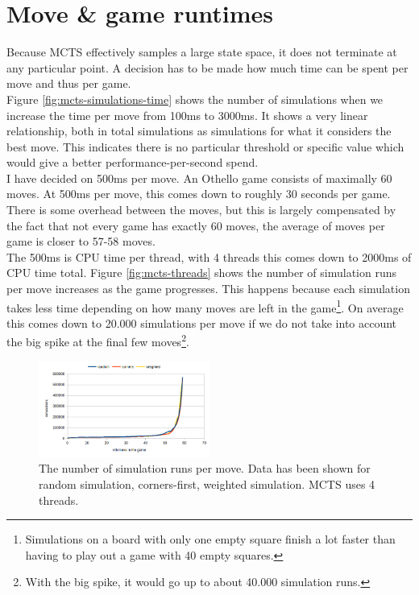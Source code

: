 \documentclass[
11pt, %
english, %
singlespacing, %
headsepline, %
]{MastersDoctoralThesis} %
\begin{document}
\section{Move \& game runtimes}
Because MCTS effectively samples a large state space, it does not terminate at any particular point. A decision has to be made how much time can be spent per move and thus per game.\\

Figure \ref{fig:mcts-simulations-time} shows the number of simulations when we increase the time per move from 100ms to 3000ms. It shows a very linear relationship, both in total simulations as simulations for what it considers the best move. This indicates there is no particular threshold or specific value which would give a better performance-per-second spend.\\

I have decided on 500ms per move. An Othello game consists of maximally 60 moves. At 500ms per move, this comes down to roughly 30 seconds per game. There is some overhead between the moves, but this is largely compensated by the fact that not every game has exactly 60 moves, the average of moves per game is closer to 57-58 moves.\\

The 500ms is CPU time per thread, with 4 threads this comes down to 2000ms of CPU time total. Figure \ref{fig:mcts-threads} shows the number of simulation runs per move increases as the game progresses. This happens because each simulation takes less time depending on how many moves are left in the game\footnote{Simulations on a board with only one empty square finish a lot faster than having to play out a game with 40 empty squares.}. On average this comes down to 20.000 simulations per move if we do not take into account the big spike at the final few moves\footnote{With the big spike, it would go up to about 40.000 simulation runs.}.\\

\begin{figure}
	\centering
	\includegraphics[width=0.5\textwidth]{images/mcts-simulations-domainknowledge}
	\caption{The number of simulation runs per move. Data has been shown for random simulation, corners-first, weighted simulation. MCTS uses 4 threads.}
	\label{fig:mcts-domainknowledge}
\end{figure}
\end{document}
